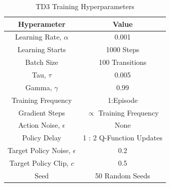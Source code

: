 \begin{table}[tb!]
  \caption{TD3 Training Hyperparameters}
  \begin{center}
  \vspace{-12pt}
  \begin{tabular}{c c}
  \textbf{Hyperameter}            & \textbf{Value}                  \\
  \hline
  \hline
  Learning Rate, $\alpha$         & 0.001                           \\
  Learning Starts                 & 1000 Steps                      \\
  Batch Size                      & 100 Transitions                 \\
  Tau, $\tau$                     & 0.005                           \\
  Gamma, $\gamma$                 & 0.99                            \\
  Training Frequency              & 1:Episode                       \\
  Gradient Steps                  & $\propto$ Training Frequency    \\
  Action Noise,  $\epsilon$       & None                            \\
  Policy Delay                    & 1 : 2 Q-Function Updates        \\
  Target Policy Noise, $\epsilon$ & 0.2                             \\
  Target Policy Clip, $c$         & 0.5                             \\
  Seed                            & 50 Random Seeds                 \\
  \hline
  \hline
  \end{tabular}
  \label{tab:ctr_hyperparams}
  \end{center}
\end{table}
%
